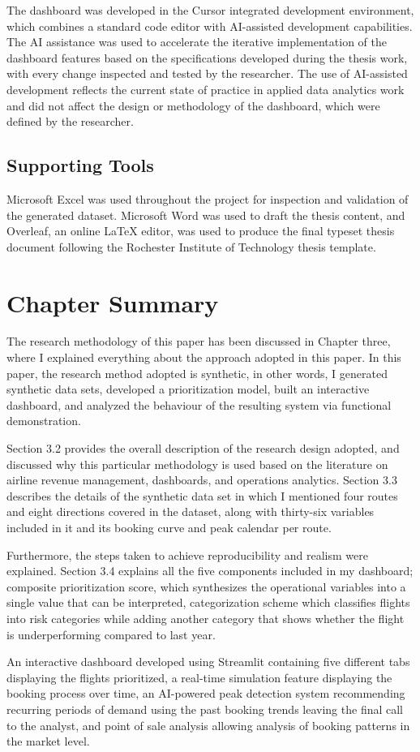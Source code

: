 The dashboard was developed in the Cursor integrated development environment, which combines a standard code editor with AI-assisted development capabilities. The AI assistance was used to accelerate the iterative implementation of the dashboard features based on the specifications developed during the thesis work, with every change inspected and tested by the researcher. The use of AI-assisted development reflects the current state of practice in applied data analytics work and did not affect the design or methodology of the dashboard, which were defined by the researcher.

\subsection{Supporting Tools}

Microsoft Excel was used throughout the project for inspection and validation of the generated dataset. Microsoft Word was used to draft the thesis content, and Overleaf, an online LaTeX editor, was used to produce the final typeset thesis document following the Rochester Institute of Technology thesis template.

\section{Chapter Summary}

The research methodology of this paper has been discussed in Chapter three, where I explained everything about the approach adopted in this paper. In this paper, the research method adopted is synthetic, in other words, I generated synthetic data sets, developed a prioritization model, built an interactive dashboard, and analyzed the behaviour of the resulting system via functional demonstration.

Section 3.2 provides the overall description of the research design adopted, and discussed why this particular methodology is used based on the literature on airline revenue management, dashboards, and operations analytics. Section 3.3 describes the details of the synthetic data set in which I mentioned four routes and eight directions covered in the dataset, along with thirty-six variables included in it and its booking curve and peak calendar per route.

Furthermore, the steps taken to achieve reproducibility and realism were explained. Section 3.4 explains all the five components included in my dashboard; composite prioritization score, which synthesizes the operational variables into a single value that can be interpreted, categorization scheme which classifies flights into risk categories while adding another category that shows whether the flight is underperforming compared to last year.

An interactive dashboard developed using Streamlit containing five different tabs displaying the flights prioritized, a real-time simulation feature displaying the booking process over time, an AI-powered peak detection system recommending recurring periods of demand using the past booking trends leaving the final call to the analyst, and point of sale analysis allowing analysis of booking patterns in the market level.